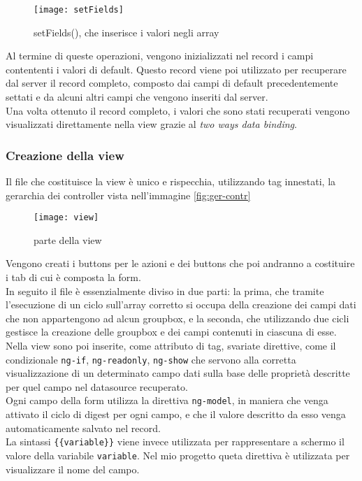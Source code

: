 \begin{figure}[h]
	\centering
	\texttt{[image: setFields]}
	\caption{setFields(), che inserisce i valori negli array}
	\label{fig:set-fields}
\end{figure}
Al termine di queste operazioni, vengono inizializzati nel record i campi contententi i valori di default. Questo record viene poi utilizzato per recuperare dal server il record completo, composto dai campi di default precedentemente settati e da alcuni altri campi che vengono inseriti dal server.\\
Una volta ottenuto il record completo, i valori che sono stati recuperati vengono visualizzati direttamente nella view grazie al \emph{two ways data binding}.

\subsubsection{Creazione della view}
Il file che costituisce la view è unico e rispecchia, utilizzando tag innestati, la gerarchia dei controller vista nell'immagine \ref{fig:ger-contr}\\
\begin{figure}[h]
	\centering
	\texttt{[image: view]}
	\caption{parte della view}
	\label{fig:view}
\end{figure}

Vengono creati i buttons per le azioni e dei buttons che poi andranno a costituire i tab di cui è composta la form.\\
In seguito il file è essenzialmente diviso in due parti: la prima, che tramite l'esecuzione di un ciclo sull'array corretto si occupa della creazione dei campi dati che non appartengono ad alcun groupbox, e la seconda, che utilizzando due cicli gestisce la creazione delle groupbox e dei campi contenuti in ciascuna di esse.
Nella view sono poi inserite, come attributo di tag, svariate direttive, come il condizionale \lstinline[language=HTML]!ng-if!, \lstinline[language=HTML]!ng-readonly!, \lstinline[language=HTML]!ng-show! che servono alla corretta visualizzazione di un determinato campo dati sulla base delle proprietà descritte per quel campo nel datasource recuperato. \\
Ogni campo della form utilizza la direttiva \lstinline[language=HTML]!ng-model!, in maniera che venga attivato il ciclo di digest per ogni campo, e che il valore descritto da esso venga automaticamente salvato nel record. \\ La sintassi \lstinline[language=HTML]!{{variable}}! viene invece utilizzata per rappresentare a schermo il valore della variabile \lstinline[language=HTML]!variable!. Nel mio progetto queta direttiva è utilizzata per visualizzare il nome del campo.

